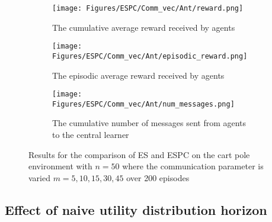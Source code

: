 \begin{figure}
    \centering
    \begin{subfigure}{0.5\textwidth}
        \centering
        \texttt{[image: Figures/ESPC/Comm\_vec/Ant/reward.png]}
        \caption{The cumulative average reward received by agents}
        \label{fig:AntCommReward}
    \end{subfigure}
    \begin{subfigure}{0.5\textwidth}
        \centering
        \texttt{[image: Figures/ESPC/Comm\_vec/Ant/episodic\_reward.png]}
        \caption{The episodic average reward received by agents}
        \label{fig:AntCommEpisodicReward}
    \end{subfigure}
    \begin{subfigure}{0.5\textwidth}
        \centering
        \texttt{[image: Figures/ESPC/Comm\_vec/Ant/num\_messages.png]}
        \caption{The cumulative number of messages sent from agents to the central learner}
        \label{fig:AntCommMessages}
    \end{subfigure}
    \caption{Results for the comparison of ES and ESPC on the cart pole environment with $n=50$ where the communication parameter is varied $m=5,10,15,30,45$ over 200 episodes}
    \label{fig:AntComm}
\end{figure}




\subsection{Effect of naive utility distribution horizon}

